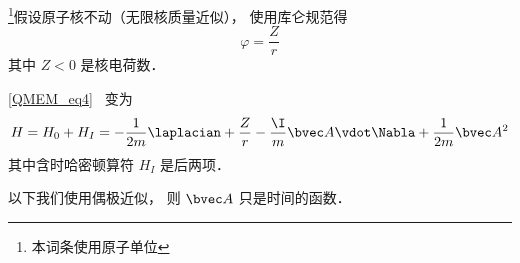 
\begin{issues}
\issueDraft
\end{issues}


\footnote{本词条使用原子单位}假设原子核不动（无限核质量近似）， 使用库仑规范得
\begin{equation}
\varphi = \frac{Z}{r}
\end{equation}
其中 $Z < 0$ 是核电荷数．

\autoref{QMEM_eq4}~ 变为
\begin{equation}
H = H_0 + H_I = -\frac{1}{2m} \laplacian +  \frac{Z}{r} - \frac{\I}{m} \bvec A \vdot \Nabla + \frac{1}{2m} \bvec A^2
\end{equation}
其中含时哈密顿算符 $H_I$ 是后两项．

以下我们使用偶极近似， 则 $\bvec A$ 只是时间的函数．
